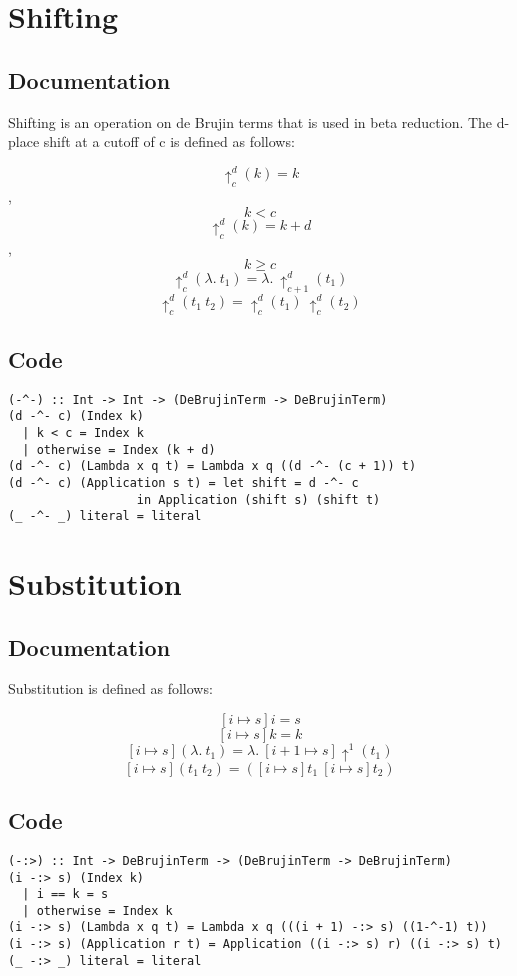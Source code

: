 \documentclass[11pt]{article}
\begin{document}
\section{Shifting}
\label{sec-6}
\subsection{Documentation}
\label{sec-6-1}
Shifting is an operation on de Brujin terms that is used in beta reduction. The d-place shift at a cutoff of c is defined as follows:

\[\uparrow^d_c(k) = k\], \[k < c\]
\[\uparrow^d_c(k) = k + d\], \[k \ge c\]
\[\uparrow^d_c(\lambda.\ t_1) = \lambda.\ \uparrow^d_{c + 1}(t_1)\]
\[\uparrow^d_c(t_1\ t_2) = \uparrow^d_c(t_1)\ \uparrow^d_c(t_2)\]

\subsection{Code}
\label{sec-6-2}
\begin{verbatim}
(-^-) :: Int -> Int -> (DeBrujinTerm -> DeBrujinTerm)
(d -^- c) (Index k)
  | k < c = Index k
  | otherwise = Index (k + d)
(d -^- c) (Lambda x q t) = Lambda x q ((d -^- (c + 1)) t)
(d -^- c) (Application s t) = let shift = d -^- c
			      in Application (shift s) (shift t)
(_ -^- _) literal = literal
\end{verbatim}


\section{Substitution}
\label{sec-7}
\subsection{Documentation}
\label{sec-7-1}
Substitution is defined as follows:

\[[i \mapsto s]i = s\]
\[[i \mapsto s]k = k\]
\[[i \mapsto s](\lambda.\ t_1) = \lambda.\ [i + 1 \mapsto s]\uparrow^1(t_1)\]
\[[i \mapsto s](t_1\ t_2) = ([i \mapsto s]t_1\ [i \mapsto s]t_2)\]

\subsection{Code}
\label{sec-7-2}
\begin{verbatim}
(-:>) :: Int -> DeBrujinTerm -> (DeBrujinTerm -> DeBrujinTerm)
(i -:> s) (Index k)
  | i == k = s
  | otherwise = Index k
(i -:> s) (Lambda x q t) = Lambda x q (((i + 1) -:> s) ((1-^-1) t))
(i -:> s) (Application r t) = Application ((i -:> s) r) ((i -:> s) t)
(_ -:> _) literal = literal
\end{verbatim}
\end{document}
